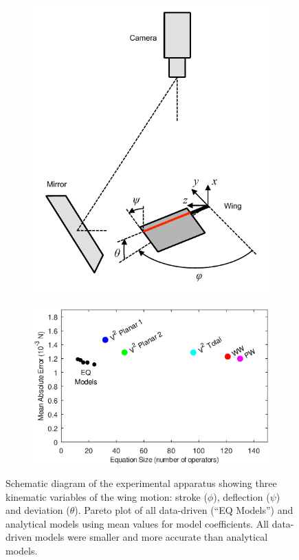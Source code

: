 \documentclass{article}
\begin{document}
\begin{figure}%
\centering
\begin{subfigure}{0.3\textwidth}
\includegraphics[trim=0 15 0 5, clip, width=\textwidth]{figures/apparatus}
\caption{\label{fig:apparatus}}
\end{subfigure}
\qquad
\begin{subfigure}{0.5\textwidth}
\centering
\includegraphics[width=\textwidth]{figures/mae_nofit}
\caption{\label{fig:pareto_mae}}
\end{subfigure}
\caption{ Schematic diagram of the experimental apparatus showing three
  kinematic variables of the wing motion: stroke ($\phi$), deflection ($\psi$) and deviation
  ($\theta$).  Pareto plot of all data-driven (``EQ Models'') and analytical
  models using mean values for model coefficients. All data-driven models were smaller and more
  accurate than analytical models.
}
\end{figure}
\end{document}
